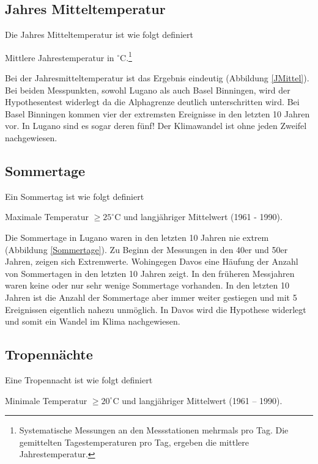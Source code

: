 \begin{refsection}
\subsection{Jahres Mitteltemperatur}
Die Jahres Mitteltemperatur ist wie folgt definiert

\begin{definition}
Mittlere Jahrestemperatur in $^{\circ}$C.\footnote{%
Systematische Messungen an den Messstationen mehrmals pro Tag. Die gemittelten Tagestemperaturen pro Tag, ergeben die mittlere Jahrestemperatur.}
\end{definition}

Bei der Jahresmitteltemperatur ist das Ergebnis eindeutig (Abbildung \ref{JMittel}). Bei beiden Messpunkten, sowohl Lugano als auch Basel Binningen, wird der Hypothesentest widerlegt da die Alphagrenze deutlich unterschritten wird. Bei Basel Binningen kommen vier der extremsten Ereignisse in den letzten 10 Jahren vor. In Lugano sind es sogar deren fünf! Der Klimawandel ist ohne jeden Zweifel nachgewiesen.


\subsection{Sommertage}
Ein Sommertag ist wie folgt definiert

\begin{definition}
Maximale Temperatur $\ge 25^{\circ}$C und langjähriger Mittelwert (1961 - 1990).
\end{definition}

Die Sommertage in Lugano waren in den letzten 10 Jahren nie extrem (Abbildung \ref{Sommertage}). Zu Beginn der Messungen in den 40er und 50er Jahren, zeigen sich Extremwerte. Wohingegen Davos eine Häufung der Anzahl von Sommertagen in den letzten 10 Jahren zeigt. In den früheren Messjahren waren keine oder nur sehr wenige Sommertage vorhanden. In den letzten 10 Jahren ist die Anzahl der Sommertage aber immer weiter gestiegen und mit 5 Ereignissen eigentlich nahezu unmöglich. In Davos wird die Hypothese widerlegt und somit ein Wandel im Klima nachgewiesen.


\subsection{Tropennächte}
Eine Tropennacht ist wie folgt definiert

\begin{definition}
Minimale Temperatur $\ge 20^{\circ}$C und langjähriger Mittelwert (1961 -- 1990).
\end{definition}


\end{refsection}
